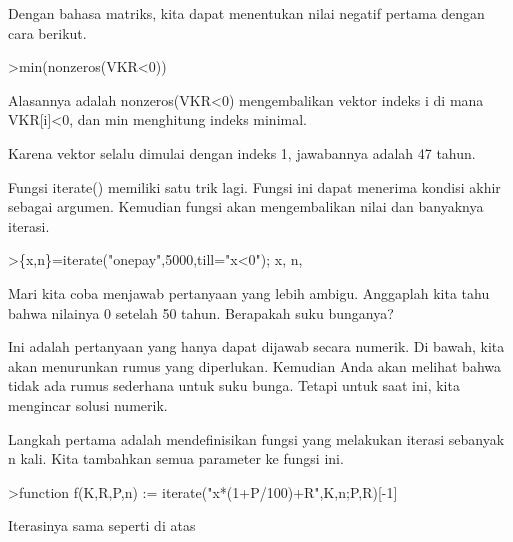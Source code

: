 \documentclass[a4paper,10pt]{article}
\begin{document}
\begin{eulernotebook}
\begin{euleroutput}
  Dengan bahasa matriks, kita dapat menentukan nilai negatif pertama dengan cara berikut.
  
\end{euleroutput}
\begin{eulerprompt}
>min(nonzeros(VKR<0))
\end{eulerprompt}
\begin{euleroutput}
  
  Alasannya adalah nonzeros(VKR<0) mengembalikan vektor indeks i di mana VKR[i]<0, dan min menghitung indeks minimal.
  
  Karena vektor selalu dimulai dengan indeks 1, jawabannya adalah 47 tahun.
  
  Fungsi iterate() memiliki satu trik lagi. Fungsi ini dapat menerima kondisi akhir sebagai argumen. Kemudian fungsi akan mengembalikan nilai dan banyaknya iterasi.
  
\end{euleroutput}
\begin{eulerprompt}
>\{x,n\}=iterate("onepay",5000,till="x<0"); x, n,
\end{eulerprompt}
\begin{euleroutput}
  
  Mari kita coba menjawab pertanyaan yang lebih ambigu. Anggaplah kita tahu bahwa nilainya 0 setelah 50 tahun. Berapakah suku bunganya?
  
  Ini adalah pertanyaan yang hanya dapat dijawab secara numerik. Di bawah, kita akan menurunkan rumus yang diperlukan. Kemudian Anda akan melihat bahwa tidak ada rumus sederhana untuk suku bunga. Tetapi untuk saat ini, kita mengincar solusi numerik.
  
  Langkah pertama adalah mendefinisikan fungsi yang melakukan iterasi sebanyak n kali. Kita tambahkan semua parameter ke fungsi ini.
  
\end{euleroutput}
\begin{eulerprompt}
>function f(K,R,P,n) := iterate("x*(1+P/100)+R",K,n;P,R)[-1]
\end{eulerprompt}
\begin{euleroutput}
  
  Iterasinya sama seperti di atas
  
\end{euleroutput}
\begin{euleroutput}
  

\end{euleroutput}
\end{eulernotebook}
\end{document}
